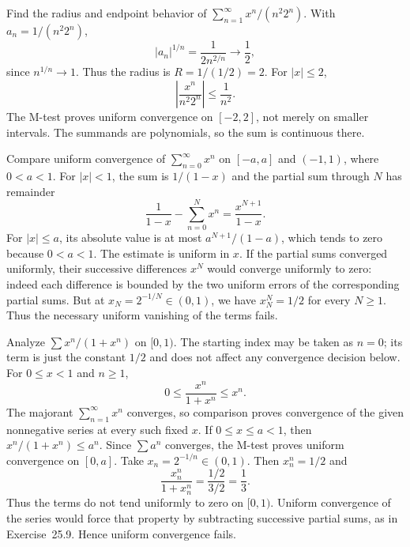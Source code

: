 \goal Find the radius and endpoint behavior of
$\sum_{n=1}^\infty x^n/(n^2 2^n)$.
With $a_n=1/(n^2 2^n)$,
\[
 |a_n|^{1/n}=\frac1{2n^{2/n}}\longrightarrow\frac12,
\]
since $n^{1/n}\to1$. Thus the radius is $R=1/(1/2)=2$.
For $|x|\le2$,
\[
 \left|\frac{x^n}{n^2 2^n}\right|\le\frac1{n^2}.
\]
The M-test proves uniform convergence on $[-2,2]$, not merely on smaller
intervals. The summands are polynomials, so the sum is continuous there.

\goal Compare uniform convergence of $\sum_{n=0}^\infty x^n$ on $[-a,a]$
and $(-1,1)$, where $0<a<1$.
For $|x|<1$, the sum is $1/(1-x)$ and the partial sum through $N$ has remainder
\[
 \frac1{1-x}-\sum_{n=0}^N x^n=\frac{x^{N+1}}{1-x}.
\]
For $|x|\le a$, its absolute value is at most $a^{N+1}/(1-a)$,
which tends to zero because $0<a<1$. The estimate is uniform in $x$.
If the partial sums converged uniformly, their successive differences $x^N$
would converge uniformly to zero: indeed each difference is bounded by the
two uniform errors of the corresponding partial sums.
But at $x_N=2^{-1/N}\in(0,1)$, we have $x_N^N=1/2$ for every $N\ge1$.
Thus the necessary uniform vanishing of the terms fails.

\goal Analyze $\sum x^n/(1+x^n)$ on $[0,1)$.
The starting index may be taken as $n=0$; its term is just the constant $1/2$
and does not affect any convergence decision below.
For $0\le x<1$ and $n\ge1$,
\[
 0\le\frac{x^n}{1+x^n}\le x^n.
\]
The majorant $\sum_{n=1}^\infty x^n$ converges, so comparison proves convergence
of the given nonnegative series at every such fixed $x$.
If $0\le x\le a<1$, then $x^n/(1+x^n)\le a^n$.
Since $\sum a^n$ converges, the M-test proves uniform convergence on $[0,a]$.
Take $x_n=2^{-1/n}\in(0,1)$. Then $x_n^n=1/2$ and
\[
 \frac{x_n^n}{1+x_n^n}=\frac{1/2}{3/2}=\frac13.
\]
Thus the terms do not tend uniformly to zero on $[0,1)$.
Uniform convergence of the series would force that property by subtracting
successive partial sums, as in Exercise~25.9. Hence uniform convergence fails.
\answer{There is pointwise convergence on $[0,1)$ and uniform convergence
on every $[0,a]$ with $a<1$, but no uniform convergence on $[0,1)$.}

